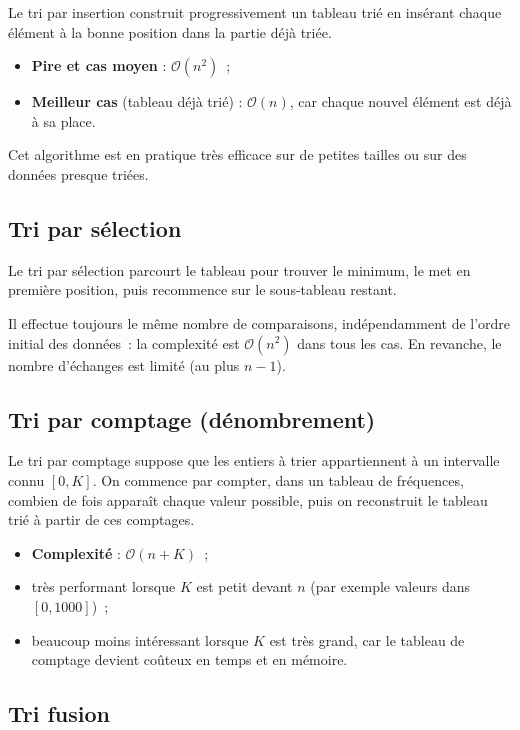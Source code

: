 \documentclass[11pt,a4paper]{article}
\begin{document}
Le tri par insertion construit progressivement un tableau trié en
insérant chaque élément à la bonne position dans la partie déjà triée.

\begin{itemize}
  \item \textbf{Pire et cas moyen} : $\mathcal{O}(n^2)$~;
  \item \textbf{Meilleur cas} (tableau déjà trié) : $\mathcal{O}(n)$,
        car chaque nouvel élément est déjà à sa place.
\end{itemize}

Cet algorithme est en pratique très efficace sur de petites tailles ou
sur des données presque triées.

\subsection{Tri par sélection}

Le tri par sélection parcourt le tableau pour trouver le minimum, le
met en première position, puis recommence sur le sous-tableau restant.

Il effectue toujours le même nombre de comparaisons, indépendamment de
l'ordre initial des données~: la complexité est
$\mathcal{O}(n^2)$ dans tous les cas.  
En revanche, le nombre d'échanges est limité (au plus $n-1$).

\subsection{Tri par comptage (dénombrement)}

Le tri par comptage suppose que les entiers à trier appartiennent à un
intervalle connu $[0, K]$.  
On commence par compter, dans un tableau de fréquences, combien de fois
apparaît chaque valeur possible, puis on reconstruit le tableau trié à
partir de ces comptages.

\begin{itemize}
  \item \textbf{Complexité} : $\mathcal{O}(n + K)$~;
  \item très performant lorsque $K$ est petit devant $n$ (par exemple
        valeurs dans $[0,1000]$)~;
  \item beaucoup moins intéressant lorsque $K$ est très grand, car le
        tableau de comptage devient coûteux en temps et en mémoire.
\end{itemize}

\subsection{Tri fusion}
\end{document}
